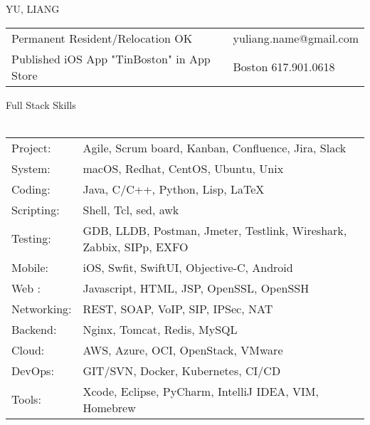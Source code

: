 \documentclass[10pt]{article}
\newcommand{\lineunder}{\vspace*{-8pt}\\\hspace*{-18pt}\hrulefill\\}
\newcommand{\header}[1]{{\hspace*{-15pt}\vspace*{6pt}\large{{#1}}}\vspace*{-6pt}\lineunder}
\begin{document}
\pagestyle{CVfooter}

\vspace*{-40pt}
\begin{center}
{\LARGE \scshape {YU, LIANG}}
\end{center}



\begin{center}

\begin{tabular}{l l}
\small{Permanent Resident/Relocation OK}    & \small{yuliang.name@gmail.com} \\
\small{Published iOS App "TinBoston" in App Store}         & \small{Boston 617.901.0618} \\
\end{tabular}

\end{center}



\header{Full Stack Skills}

\begin{tabular}{l l}

Project: & Agile, Scrum board, Kanban, Confluence, Jira, Slack \\
System: & macOS, Redhat, CentOS, Ubuntu, Unix \\
Coding: & Java, C/C++, Python, Lisp, \LaTeX \\
Scripting: & Shell, Tcl, sed, awk \\
Testing: & GDB, LLDB, Postman, Jmeter, Testlink, Wireshark, Zabbix, SIPp, EXFO \\
Mobile: & iOS, Swfit, SwiftUI, Objective-C, Android \\
Web : & Javascript, HTML, JSP, OpenSSL, OpenSSH \\
Networking: & REST, SOAP, VoIP, SIP, IPSec, NAT  \\
Backend: & Nginx, Tomcat, Redis, MySQL \\
Cloud: & AWS, Azure, OCI, OpenStack, VMware \\
DevOps: & GIT/SVN, Docker, Kubernetes, CI/CD \\
Tools: & Xcode, Eclipse, PyCharm, IntelliJ IDEA, VIM, Homebrew \\

\end{tabular}
\vspace*{10pt}
\end{document}
